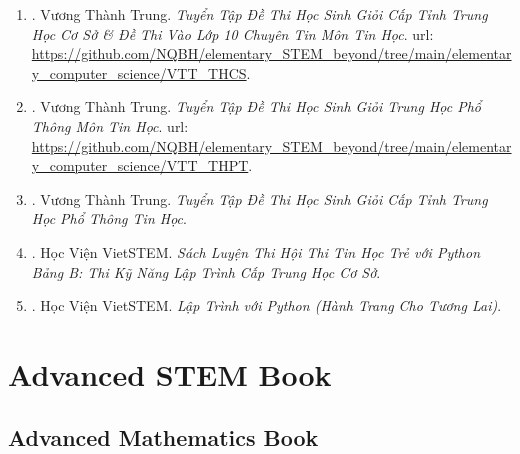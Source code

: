\documentclass{article}
\begin{document}
\begin{enumerate}
	\item \cite{Trung_THCS_Tin}. Vương Thành Trung. {\it Tuyển Tập Đề Thi Học Sinh Giỏi Cấp Tỉnh Trung Học Cơ Sở \& Đề Thi Vào Lớp 10 Chuyên Tin Môn Tin Học}. {\sc url}: \url{https://github.com/NQBH/elementary_STEM_beyond/tree/main/elementary_computer_science/VTT_THCS}.\hfill{\sf[reading]}
	\item \cite{Trung_THPT_Tin}. Vương Thành Trung. {\it Tuyển Tập Đề Thi Học Sinh Giỏi Trung Học Phổ Thông Môn Tin Học}. {\sc url}: \url{https://github.com/NQBH/elementary_STEM_beyond/tree/main/elementary_computer_science/VTT_THPT}.\hfill{\sf[reading]}
	\item \cite{Trung_HSG_THPT_Tin}. Vương Thành Trung. {\it Tuyển Tập Đề Thi Học Sinh Giỏi Cấp Tỉnh Trung Học Phổ Thông Tin Học}.\hfill{\sf[reading]}
	\item \cite{VietSTEM2021}. Học Viện VietSTEM. {\it Sách Luyện Thi Hội Thi Tin Học Trẻ  với Python Bảng B: Thi Kỹ Năng Lập Trình Cấp Trung Học Cơ Sở}.\hfill{\sf[reading]}
	\item \cite{VietSTEM2022}. Học Viện VietSTEM. {\it Lập Trình với Python (Hành Trang Cho Tương Lai)}.\hfill{\sf[done]}
\end{enumerate}


\section{Advanced STEM Book}

\subsection{Advanced Mathematics Book}
\end{document}
